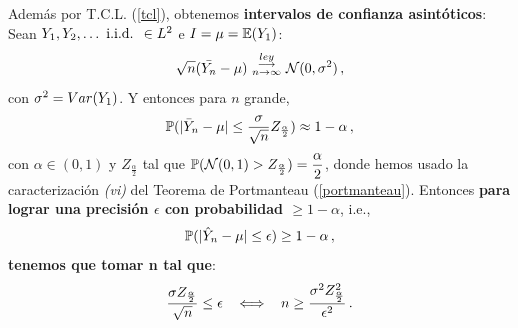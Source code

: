 Además por T.C.L. (\ref{tcl}), obtenemos \textbf{intervalos de confianza asintóticos}: Sean $Y_1,Y_2,\dots \iid\in L^2 $ e $I=\mu=\E(Y_1)$:
$$ \sqrt{n}(\bar{Y_n}-\mu)\convley\normal(0,\sigma^2) \, ,$$
con $\sigma^2=\var(Y_1)$. Y entonces para $n$ grande,
$$ \P(|\bar{Y}_n-\mu|\leq\displaystyle\frac{\sigma}{\sqrt{n}}Z_{\frac{\alpha}{2}})\approx 1-\alpha \, ,$$
con $\alpha\in(0,1)$ y $Z_{\frac{\alpha}{2}}$ tal que $\P(\normal(0,1)>Z_{\frac{\alpha}{2}})=\displaystyle\frac{\alpha}{2}$, donde hemos usado la caracterización \textit{(vi)} del Teorema de Portmanteau (\ref{portmanteau}).
\newp Entonces \textbf{para lograr una precisión $\epsilon$ con probabilidad $\geq1-\alpha$}, i.e., $$\P(|\hat{Y}_n-\mu|\leq \epsilon)\geq1-\alpha \, ,$$ \textbf{tenemos que tomar n tal que}:
$$ \displaystyle\frac{\sigma Z_{\frac{\alpha}{2}}}{\sqrt{n}}\leq\epsilon \espacio \ssi \espacio n \geq \frac{\sigma^2 Z^2_{\frac{\alpha}{2}}}{\epsilon^2} \, .$$
\vspace{1cm}
